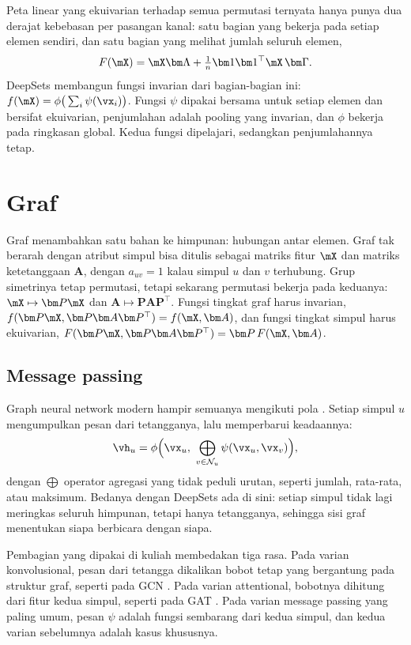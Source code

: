 Peta linear yang ekuivarian terhadap semua permutasi ternyata hanya punya dua derajat kebebasan
per pasangan kanal: satu bagian yang bekerja pada setiap elemen sendiri, dan satu bagian yang
melihat jumlah seluruh elemen,
\begin{equation}
F(\mX)=\mX\bm\Lambda+\tfrac1n\bm 1\bm 1^\top\mX\,\bm\Gamma.
\end{equation}
DeepSets \citep{zaheer2017} membangun fungsi invarian dari bagian-bagian ini:
$f(\mX)=\phi\big(\sum_i\psi(\vx_i)\big)$. Fungsi $\psi$ dipakai bersama untuk setiap elemen dan
bersifat ekuivarian, penjumlahan adalah pooling yang invarian, dan $\phi$ bekerja pada ringkasan
global. Kedua fungsi dipelajari, sedangkan penjumlahannya tetap.

\section{Graf}

Graf menambahkan satu bahan ke himpunan: hubungan antar elemen. Graf tak berarah dengan atribut
simpul bisa ditulis sebagai matriks fitur $\mX$ dan matriks ketetanggaan $\bm A$, dengan
$a_{uv}=1$ kalau simpul $u$ dan $v$ terhubung. Grup simetrinya tetap permutasi, tetapi sekarang
permutasi bekerja pada keduanya: $\mX\mapsto\bm P\mX$ dan $\bm A\mapsto\bm P\bm A\bm P^\top$. Fungsi
tingkat graf harus invarian, $f(\bm P\mX,\bm P\bm A\bm P^\top)=f(\mX,\bm A)$, dan fungsi tingkat
simpul harus ekuivarian, $F(\bm P\mX,\bm P\bm A\bm P^\top)=\bm P\,F(\mX,\bm A)$.

\subsection{Message passing}

Graph neural network modern hampir semuanya mengikuti pola 
\citep{gilmer2017,battaglia2018}. Setiap simpul $u$ mengumpulkan pesan dari tetangganya, lalu
memperbarui keadaannya:
\begin{equation}
\vh_u=\phi\Big(\vx_u,\ \bigoplus_{v\in\mathcal N_u}\psi(\vx_u,\vx_v)\Big),
\end{equation}
dengan $\bigoplus$ operator agregasi yang tidak peduli urutan, seperti jumlah, rata-rata, atau
maksimum. Bedanya dengan DeepSets ada di sini: setiap simpul tidak lagi meringkas seluruh himpunan,
tetapi hanya tetangganya, sehingga sisi graf menentukan siapa berbicara dengan siapa.

Pembagian yang dipakai di kuliah membedakan tiga rasa. Pada varian konvolusional, pesan dari
tetangga dikalikan bobot tetap yang bergantung pada struktur graf, seperti pada GCN
\citep{kipf2017}. Pada varian attentional, bobotnya dihitung dari fitur kedua simpul, seperti pada
GAT \citep{velickovic2018}. Pada varian message passing yang paling umum, pesan $\psi$ adalah fungsi
sembarang dari kedua simpul, dan kedua varian sebelumnya adalah kasus khususnya.


